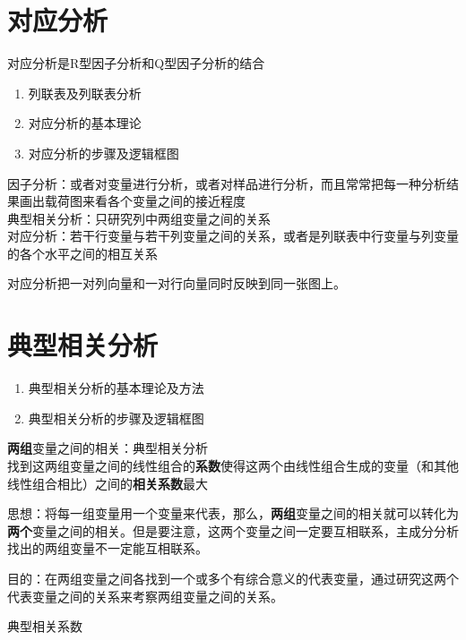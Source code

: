 \documentclass[UTF8,10pt]{book}
\begin{document}
\section{对应分析}\label{header-n82}

对应分析是R型因子分析和Q型因子分析的结合

\begin{enumerate}
	\def\labelenumi{\arabic{enumi}.}
	\item
	列联表及列联表分析
	\item
	对应分析的基本理论
	\item
	对应分析的步骤及逻辑框图
\end{enumerate}

因子分析：或者对变量进行分析，或者对样品进行分析，而且常常把每一种分析结果画出载荷图来看各个变量之间的接近程度\\
典型相关分析：只研究列中两组变量之间的关系\\
对应分析：若干行变量与若干列变量之间的关系，或者是列联表中行变量与列变量的各个水平之间的相互关系

对应分析把一对列向量和一对行向量同时反映到同一张图上。

\section{典型相关分析}\label{header-n91}

\begin{enumerate}
	\def\labelenumi{\arabic{enumi}.}
	\item
	典型相关分析的基本理论及方法
	\item
	典型相关分析的步骤及逻辑框图
\end{enumerate}

\textbf{两组}变量之间的相关：典型相关分析\\
找到这两组变量之间的线性组合的\textbf{系数}使得这两个由线性组合生成的变量（和其他线性组合相比）之间的\textbf{相关系数}最大

思想：将每一组变量用一个变量来代表，那么，\textbf{两组}变量之间的相关就可以转化为\textbf{两个}变量之间的相关。但是要注意，这两个变量之间一定要互相联系，主成分分析找出的两组变量不一定能互相联系。

目的：在两组变量之间各找到一个或多个有综合意义的代表变量，通过研究这两个代表变量之间的关系来考察两组变量之间的关系。

典型相关系数
\end{document}
